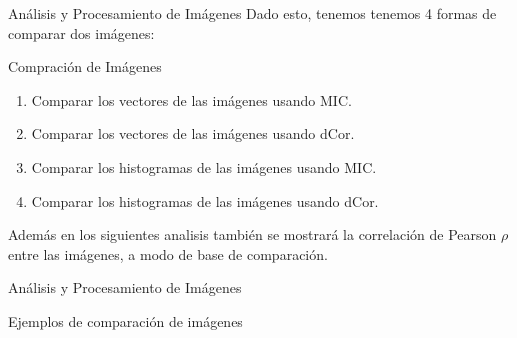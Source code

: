 \documentclass{beamer}
\begin{document}
\begin{frame}{Análisis y Procesamiento de Imágenes}
    Dado esto, tenemos tenemos 4 formas de comparar dos imágenes:
    \pause
    \begin{block}{Compración de Imágenes}
        \begin{enumerate}
            \item Comparar los vectores de las imágenes usando MIC.
            \pause
            \item Comparar los vectores de las imágenes usando dCor.
            \pause
            \item Comparar los histogramas de las imágenes usando MIC.
            \pause
            \item Comparar los histogramas de las imágenes usando dCor.
        \end{enumerate}
    \end{block}
    \pause
    Además en los siguientes analisis también se mostrará la correlación de Pearson $\rho$ entre las imágenes, a modo de base de comparación.
\end{frame}

\begin{frame}{Análisis y Procesamiento de Imágenes}
    \begin{center}
        {\Large Ejemplos de comparación de imágenes}
    \end{center}
\end{frame}
\end{document}
